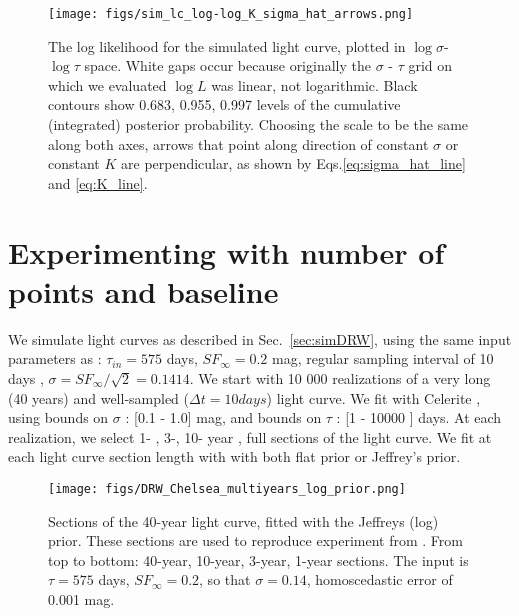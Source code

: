\documentclass[fleqn,usenatbib]{mnras}  %
\begin{document}
\begin{figure}
\texttt{[image: figs/sim\_lc\_log-log\_K\_sigma\_hat\_arrows.png]}
\caption{The log likelihood for the simulated light curve, plotted in  $\log{\sigma}$-$\log{\tau}$ space.  White gaps occur because originally the   $\sigma$ - $\tau$ grid on which we evaluated $\log{L}$ was linear, not logarithmic.  Black contours show 0.683, 0.955, 0.997 levels of the cumulative (integrated) posterior probability. Choosing the scale to be the same along both axes,  arrows that point along direction of constant $\hat{\sigma}$ or constant $K$ are perpendicular, as shown by Eqs.\ref{eq:sigma_hat_line} and \ref{eq:K_line}. }
\label{fig:lc_logL_arrows}
\end{figure} 


\section{Experimenting with number of points and baseline}

We simulate  light curves as described in Sec.~\ref{sec:simDRW}, using the same input parameters as \cite{macleod2011} : $\tau_{in} = 575 $ days, $SF_{\infty}= 0.2 $ mag, regular sampling interval of 10 days ,  $\sigma = SF_{\infty} / \sqrt{2} = 0.1414 $.  We start with 10 000 realizations of a very long (40 years)  and well-sampled  ($\Delta t = 10 days$) light curve.  We fit with Celerite , using bounds on $\sigma$ : [0.1 - 1.0] mag,  and bounds on $\tau$ : [1 - 10000 ] days. At each realization,  we select 1- , 3-, 10- year , full sections of the light curve. We fit at each light curve section length with   with both flat prior or Jeffrey's prior. 

\begin{figure}
\texttt{[image: figs/DRW\_Chelsea\_multiyears\_log\_prior.png]}
\caption{Sections of the 40-year light curve, fitted with the Jeffreys (log) prior. These sections are used to reproduce experiment from \citep{macleod2011}.  From top to bottom: 40-year, 10-year, 3-year, 1-year sections. The input is $\tau = 575$ days, $SF_{\infty} = 0.2$, so that $\sigma = 0.14$, homoscedastic error of 0.001 mag.  }
\label{fig:lc_sections}
\end{figure}


\end{document}
